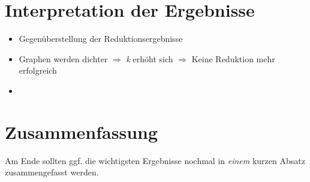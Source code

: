 \section{Interpretation der Ergebnisse}
\label{ch:Analyse:sec:Interpretation}

\begin{itemize}
\item Gegenüberstellung der Reduktionsergebnisse
\item Graphen werden dichter $\Rightarrow$ \emph{k} erhöht sich $\Rightarrow$ Keine Reduktion mehr erfolgreich
\item 
\end{itemize}


\section{Zusammenfassung}
\label{ch:Analyse:sec:zusammenfassung}

Am Ende sollten ggf. die wichtigsten Ergebnisse nochmal in \emph{einem}
kurzen Absatz zusammengefasst werden.

